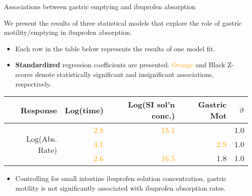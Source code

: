 \documentclass[]{beamer}
\begin{document}
\begin{frame}{Associations between gastric emptying and ibuprofen absorption}

\small

We present the results of three statistical models that explore the role of gastric motility/emptying in ibuprofen absorption.

\begin{itemize}
	\item Each row in the table below represents the results of one model fit.
	\item {\bf Standardized} regression coefficients are presented. \textcolor{orange}{Orange} and Black Z-scores denote statistically significant and insignificant associations, respectively. 
\end{itemize}

\footnotesize
\begin{table}[ht]
\centering
\begin{tabular}{r||rrr|r}
Response & Log(time) & Log(SI sol'n conc.) & Gastric Mot & $\hat{\sigma}$\\
\hline
\multirow{3}{*}{Log(Abs. Rate)} & \textcolor{orange}{2.8} & \textcolor{orange}{15.1} & & 1.0\\
 & \textcolor{orange}{4.1} &  & \textcolor{orange}{2.9} & 1.0\\
 & \textcolor{orange}{2.6} & \textcolor{orange}{16.5} & 1.8 & 1.0\\
\hline
\end{tabular}
\end{table}
\small

\begin{itemize}
	\item Controlling for small intestine ibuprofen solution concentration, gastric motility is not significantly associated with ibuprofen absorption rates.
\end{itemize}

\end{frame}
\end{document}
